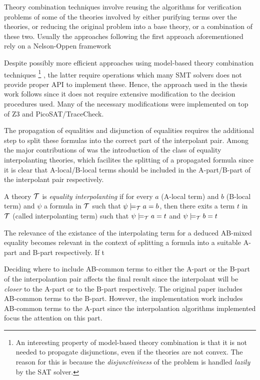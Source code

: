 Theory combination techniques involve 
reusing the algorithms for verification 
problems of some of the theories involved 
by either purifying terms over the 
theories, or reducing the original problem 
into a base theory, or a combination of these two. 
Usually the approaches following the first approach 
aforementioned rely on a Nelson-Oppen
framework \cite{10.1007/11532231_26, 
10.1007/978-3-642-22119-4_1, 10.1145/2490253}

Despite possibly more efficient approaches using
model-based theory combination techniques 
\footnote{
  An interesting property of model-based theory combination 
  is that it is not needed to propagate disjunctions, even if
  the theories are not convex. The reason for this is because
  the \emph{disjunctiviness} of the problem is handled 
  \emph{lazily} by the
  SAT solver.
} \cite{10.1007/978-3-642-22119-4_1}, the latter require 
operations which many SMT solvers does not provide 
proper API to implement these.
Hence, the approach used in the thesis work follows 
\cite{10.1007/11532231_26} since it does not require extensive
modification to the decision procedures
used. Many of the necessary modifications 
were implemented on top of Z3 and PicoSAT/TraceCheck.

The propagation of equalities and disjunction of equalities
requires the additional step to split these formulas into
the correct part of the interpolant pair. Among the major
contributions of \cite{10.1007/11532231_26} was the introduction
of the class of equality interpolanting theories, which
facilites the splitting of a propagated formula since
it is clear that A-local/B-local terms should be included in the
A-part/B-part of the interpolant pair respectively.

\begin{definition}
  A theory $\cal{T}$ is \emph{equality interpolanting}
  if for every $a$ (A-local term) and  $b$ (B-local term)
  and $\psi$ a formula in $\cal{T}$ such that
  $\psi \models_{\cal{T}} a = b$, then there exits a term $t$
  in $\cal{T}$ (called interpolanting term)
  such that $\psi \models_{\cal{T}} a = t$ and 
  $\psi \models_{\cal{T}} b = t$
\end{definition}

The relevance of the existance of the interpolating term for 
a deduced AB-mixed equality becomes relevant in the context 
of splitting a formula into a suitable A-part and B-part 
respectively. If t

Deciding where to include AB-common terms to either the 
A-part or the B-part of the interpolantion pair affects 
the final result since the interpolant will be \emph{closer} 
to the A-part or to the B-part respectively. The original
paper includes AB-common terms to the B-part. However,
the implementation work includes AB-common terms to the
A-part since the interpolantion algorithms implemented
focus the attention on this part.

